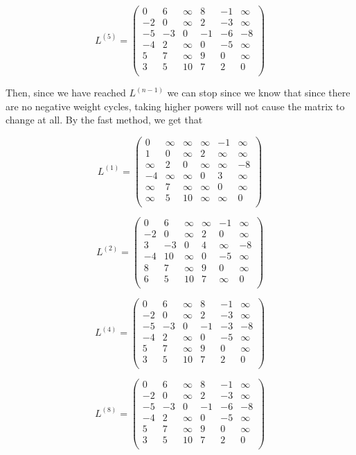 \documentclass{article}
\begin{document}
\[
L^{(5)} = \left(\begin{array}{cccccc}
0&6&\infty&8&-1&\infty\\
-2&0&\infty&2&-3&\infty\\
-5&-3&0&-1&-6&-8\\
-4&2&\infty&0&-5&\infty\\
5&7&\infty&9&0&\infty\\
3&5&10&7&2&0\\
\end{array}\right)
\]

Then, since we have reached $L^{(n-1)}$ we can stop since we know that since there are no negative weight cycles, taking higher powers will not cause the matrix to change at all. By the fast method, we get that

\[
L^{(1)} = \left(\begin{array}{cccccc}
0&\infty&\infty&\infty&-1&\infty\\
1&0&\infty&2&\infty&\infty\\
\infty&2&0&\infty&\infty&-8\\
-4&\infty&\infty&0&3&\infty\\
\infty&7&\infty&\infty&0&\infty\\
\infty&5&10&\infty&\infty&0\\
\end{array}\right)
\]

\[
L^{(2)} = \left(\begin{array}{cccccc}
0&6&\infty&\infty&-1&\infty\\
-2&0&\infty&2&0&\infty\\
3&-3&0&4&\infty&-8\\
-4&10&\infty&0&-5&\infty\\
8&7&\infty&9&0&\infty\\
6&5&10&7&\infty&0\\
\end{array}\right)
\]

\[
L^{(4)} = \left(\begin{array}{cccccc}
0&6&\infty&8&-1&\infty\\
-2&0&\infty&2&-3&\infty\\
-5&-3&0&-1&-3&-8\\
-4&2&\infty&0&-5&\infty\\
5&7&\infty&9&0&\infty\\
3&5&10&7&2&0\\
\end{array}\right)
\]

\[
L^{(8)} = \left(\begin{array}{cccccc}
0&6&\infty&8&-1&\infty\\
-2&0&\infty&2&-3&\infty\\
-5&-3&0&-1&-6&-8\\
-4&2&\infty&0&-5&\infty\\
5&7&\infty&9&0&\infty\\
3&5&10&7&2&0\\
\end{array}\right)
\]
\end{document}
